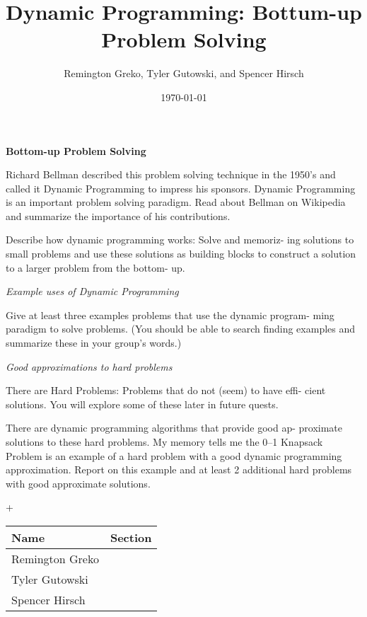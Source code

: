 \documentclass{article}
\begin{document}
\title{\textbf{Dynamic Programming: Bottum-up Problem Solving}}
\author{Remington Greko, Tyler Gutowski, and Spencer Hirsch}
\date{\today}

\maketitle

\noindent \textbf{Bottom-up Problem Solving} 


Richard Bellman described this problem solving technique in the
1950’s and called it Dynamic Programming to impress his sponsors.
Dynamic Programming is an important problem solving paradigm.
Read about Bellman on Wikipedia and summarize the importance
of his contributions.

\medskip

Describe how dynamic programming works: Solve and memoriz-
ing solutions to small problems and use these solutions as building
blocks to construct a solution to a larger problem from the bottom-
up.

\bigskip

\noindent \textit{Example uses of Dynamic Programming}


Give at least three examples problems that use the dynamic program-
ming paradigm to solve problems. (You should be able to search
finding examples and summarize these in your group’s words.)

\bigskip

\noindent \textit{Good approximations to hard problems}

\medskip

There are Hard Problems: Problems that do not (seem) to have effi-
cient solutions. You will explore some of these later in future quests.

\medskip

There are dynamic programming algorithms that provide good ap-
proximate solutions to these hard problems. My memory tells me the
0–1 Knapsack Problem is an example of a hard problem with a good
dynamic programming approximation. Report on this example and
at least 2 additional hard problems with good approximate solutions.


\pagebreak+

\begin{center}
        \begin{tabular}{|p{3cm}|p{6cm}|}
            \hline
            \textbf{Name} & \textbf{Section} \\
            \hline
            Remington Greko &  \\
            \hline
            Tyler Gutowski &  \\
            \hline
            Spencer Hirsch &  \\
            \hline
        \end{tabular}
    \end{center}
    
\end{document}
